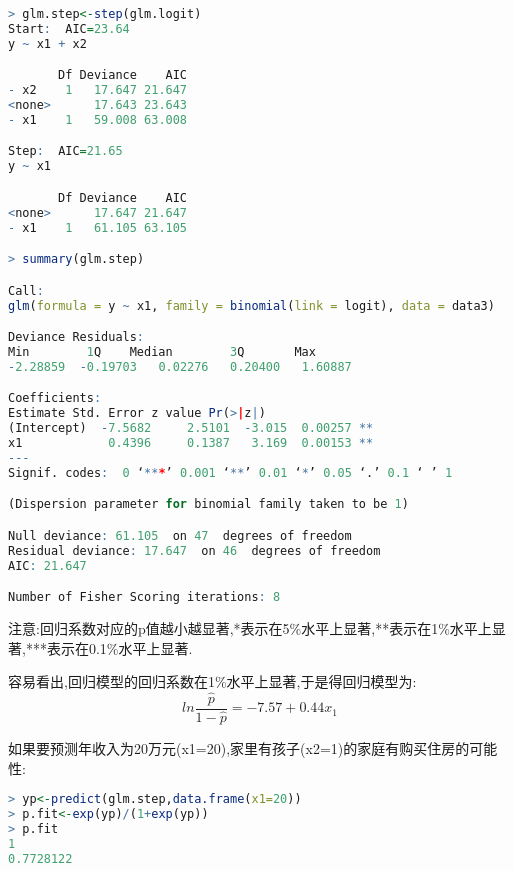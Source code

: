 \documentclass[11pt,a4paper,oneside]{book}
\begin{document}
\begin{lstlisting}[language=r]
> glm.step<-step(glm.logit)
Start:  AIC=23.64
y ~ x1 + x2

       Df Deviance    AIC
- x2    1   17.647 21.647
<none>      17.643 23.643
- x1    1   59.008 63.008

Step:  AIC=21.65
y ~ x1

       Df Deviance    AIC
<none>      17.647 21.647
- x1    1   61.105 63.105

> summary(glm.step)

Call:
glm(formula = y ~ x1, family = binomial(link = logit), data = data3)

Deviance Residuals: 
Min        1Q    Median        3Q       Max  
-2.28859  -0.19703   0.02276   0.20400   1.60887  

Coefficients:
Estimate Std. Error z value Pr(>|z|)   
(Intercept)  -7.5682     2.5101  -3.015  0.00257 **
x1            0.4396     0.1387   3.169  0.00153 **
---
Signif. codes:  0 ‘***’ 0.001 ‘**’ 0.01 ‘*’ 0.05 ‘.’ 0.1 ‘ ’ 1

(Dispersion parameter for binomial family taken to be 1)

Null deviance: 61.105  on 47  degrees of freedom
Residual deviance: 17.647  on 46  degrees of freedom
AIC: 21.647

Number of Fisher Scoring iterations: 8
\end{lstlisting}
注意:回归系数对应的p值越小越显著,*表示在5$ \% $水平上显著,**表示在1$ \% $水平上显著,***表示在0.1$ \% $水平上显著.

容易看出,回归模型的回归系数在1$ \% $水平上显著,于是得回归模型为:
\[ln\frac{\hat{p}}{1-\hat{p}}=-7.57+0.44x_1\]

如果要预测年收入为20万元(x1=20),家里有孩子(x2=1)的家庭有购买住房的可能性:

\begin{lstlisting}[language=r]
> yp<-predict(glm.step,data.frame(x1=20))
> p.fit<-exp(yp)/(1+exp(yp))
> p.fit
1 
0.7728122 
\end{lstlisting}
\end{document}
